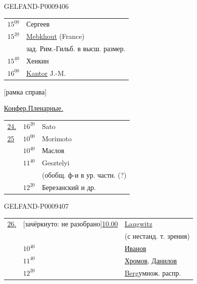 \begin{GelfandAdjacentEvidence}{GELFAND-P000940}{6}


\begin{tabular}{@{}ll@{}}
$15^{\underline{00}}$ & Сергеев\\
$15^{\underline{20}}$ & \underline{Mebkhout} (France)\\
& зад. Рим.-Гильб. в высш. размер.\\
$15^{\underline{40}}$ & Хенкин\\
$16^{\underline{00}}$ & \underline{Kantor} J.-M.
\end{tabular}

[рамка справа]

\underline{Конфер.}\qquad\underline{\underline{Пленарные.}}

\begin{tabular}{@{}lll@{}}
\underline{24.} & $16^{\underline{20}}$ & Sato\\
\underline{25} & $10^{\underline{00}}$ & Morimoto\\
 & $10^{\underline{40}}$ & Маслов\\
 & $11^{\underline{40}}$ & Gesztelyi\\
 & & (обобщ. ф-и в ур. частн. (?)\\
 & $12^{\underline{20}}$ & Березанский и др.
\end{tabular}
\end{GelfandAdjacentEvidence}
\begin{GelfandAdjacentEvidence}{GELFAND-P000940}{7}


\begin{tabular}{@{}lll@{}}
\underline{26.} & [зачёркнуто: не разобрано]\quad\underline{10.00} & \underline{Laugwitz}\\
 & & (с нестанд. т. зрения)\\
 & $10^{\underline{40}}$ & \underline{Иванов}\\
 & $11^{\underline{40}}$ & \underline{Хромов}, \underline{Данилов}\\
 & $12^{\underline{20}}$ & \underline{Berg}\quad умнож. распр.
\end{tabular}
\end{GelfandAdjacentEvidence}
